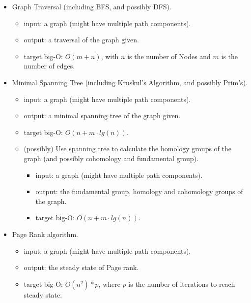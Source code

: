 \documentclass[11pt]{amsart}
\theoremstyle{definition}
\begin{document}
\begin{spacing}{1}
    \begin{itemize}
        \item Graph Traversal (including BFS, and possibly DFS).
            \begin{itemize}
                \item input: a graph (might have multiple path components).
                \item output: a traversal of the graph given.
                \item target big-O: $O(m+n)$, with $n$ is the number of Nodes and $m$ is the number of edges.
            \end{itemize}
        \item Minimal Spanning Tree (including Kruskul's Algorithm, and possibly Prim's).
            \begin{itemize}
                \item input: a graph (might have multiple path components).
                \item output: a minimal spanning tree of the graph given.
                \item target big-O: $O(n+m\cdot lg(n)).$
            \end{itemize}
            
            \begin{itemize}
                \item (possibly) Use spanning tree to calculate the homology groups of the graph (and possibly cohomology and fundamental group).
                \begin{itemize}
                    \item input: a graph (might have multiple path components).
                    \item output: the fundamental group, homology and cohomology groups of the graph.
                    \item target big-O: $O(n+m\cdot lg(n)).$
                \end{itemize}
            \end{itemize}
        \item Page Rank algorithm.
        \begin{itemize}
                \item input: a graph (might have multiple path components).
                \item output: the steady state of Page rank.
                \item target big-O: $O(n^2)*p$, where $p$ is the number of iterations to reach steady state.
            \end{itemize}
    \end{itemize}




\end{spacing}
\end{document}
